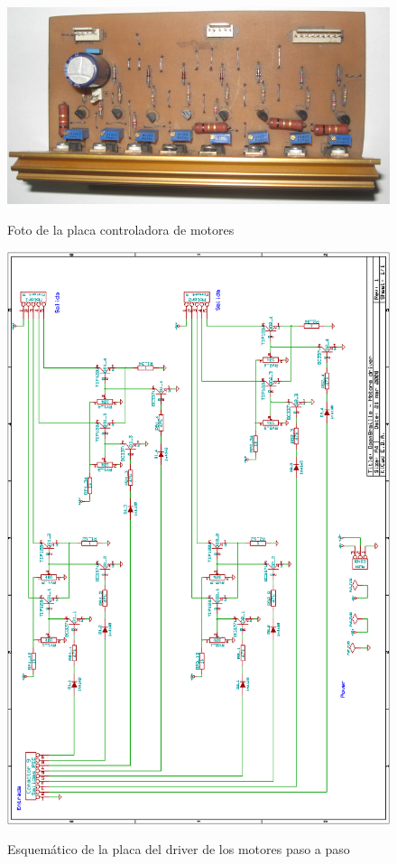 \begin{figure}[htp]
  \centering
  \includegraphics[width=14cm]{./img/fotos/motors_board.png}
  \label{fig:motors_board}
  \caption{Foto de la placa controladora de motores}
\end{figure}

\begin{figure}[htp]
  \centering
  \includegraphics[width=\textwidth,height=\textheight]{./img/driver.png}
  \label{cap:driver_schema}
  \caption{Esquem\'atico de la placa del driver de los motores paso a paso}
\end{figure}
\clearpage

